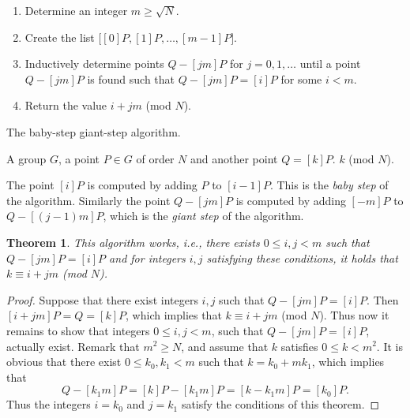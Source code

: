 \documentclass{article}
\numberwithin{equation}{section}
\newtheorem{theorem}{Theorem}[subsection]
\theoremstyle{definition}
\begin{document}
\begin{enumerate}
\item Determine an integer $m \geq \sqrt{N}$.
\item Create the list $\big[[0]P,[1]P,\ldots,[m-1]P\big]$.
\item Inductively determine points $Q-[jm]P$ for $j=0,1,\ldots$ until a point $Q-[jm]P$ is found such that $Q-[jm]P=[i]P$ for some $i<m$.
\item Return the value $i+jm$ (mod $N$).
\end{enumerate}

\begin{algorithm}
\caption{The baby-step giant-step algorithm.}
\begin{algorithmic}[1]\label{PH}
  \normalsize
  \REQUIRE A group $G$, a point $P \in G$ of order $N$ and another point $Q = [k]P$.
  \ENSURE $k$ (mod $N$).
  \ENDIF
  \ENDFOR
\end{algorithmic}
\end{algorithm}

The point $[i]P$ is computed by adding $P$ to $[i-1]P$. This is the \emph{baby step} of the algorithm. Similarly the point $Q-[jm]P$ is computed by adding $[-m]P$ to $Q-[(j-1)m]P$, which is the \emph{giant step} of the algorithm.

\begin{theorem}\label{bsgsproof}
This algorithm works, i.e., there exists $0 \leq i,j < m$ such that $Q-[jm]P=[i]P$ and for integers $i,j$ satisfying these conditions, it holds that $k \equiv i+jm$ (mod $N$).
\end{theorem}

\begin{proof}
Suppose that there exist integers $i,j$ such that $Q-[jm]P=[i]P$. Then $[i+jm]P=Q=[k]P$, which implies that $k \equiv i+jm$ (mod $N$). Thus now it remains to show that integers $0 \leq i,j<m$, such that $Q-[jm]P=[i]P$, actually exist. Remark that $m^2 \geq N$, and assume that $k$ satisfies $0 \leq k < m^2$. It is obvious that there exist $0 \leq k_0,k_1 < m$ such that $k = k_0+mk_1$, which implies that $$Q-[k_1m]P = [k]P-[k_1m]P = [k-k_1m]P = [k_0]P.$$ Thus the integers $i=k_0$ and $j=k_1$ satisfy the conditions of this theorem.
\end{proof}
\end{document}
